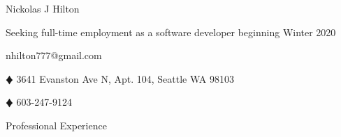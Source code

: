 \documentclass{article}
\newcommand{\lineseparator}[1]{\noindent\makebox[\linewidth]{\rule{\textwidth}{#1}}}
\begin{document}
\begin{minipage}[t]{0.4\textwidth}
  \hspace{-6.5mm}
  {\Huge Nickolas J Hilton }
\end{minipage}
\hspace{-6.5mm}
\begin{minipage}[b]{0.6\textwidth}
  \begin{flushright}
    {\small Seeking full-time employment as a software developer beginning Winter 2020 }
  \end{flushright}
\end{minipage}
\vspace{1mm}
\lineseparator{1.5pt}
\vspace{-2mm}
\begin{center}
  nhilton777@gmail.com 
  \begin{inparaitem}
  \item[$\vardiamond$] 3641 Evanston Ave N, Apt. 104, Seattle WA 98103
  \item[$\vardiamond$] 603-247-9124 
  \end{inparaitem}
\end{center}
{\Large Professional Experience } \\
\lineseparator{0.5pt}
\\[4mm]
\end{document}
